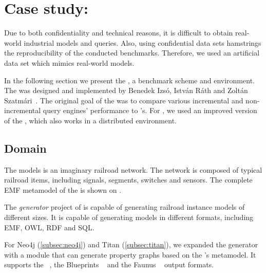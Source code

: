 \section{Case study: \tb{}}
\label{sec:trainbenchmark}

Due to both confidentiality and technical reasons, it is difficult to obtain real-world industrial models and queries. Also, using confidential data sets hamstrings the reproducibility of the conducted benchmarks. Therefore, we used an artificial data set which mimics real-world models.

In the following section we present the \textit{\tb{}}, a benchmark scheme and environment. The \tb{} was designed and implemented by Benedek Izsó, István Ráth and Zoltán Szatmári~\cite{Izso:2012:ODD:2428516.2428523}. The original goal of the \tb{} was to compare various incremental and non-incremental query engines' performance to \eiq{}'s. For \iqd{}, we used an improved version of the \tb{}, which also works in a distributed environment.

\subsection{Domain}


The \tb{} models is an imaginary railroad network. The network is composed of typical railroad items, including signals, segments, switches and sensors. The complete EMF metamodel of the \tb{} is shown on . 

The \textit{generator} project of \tb{} is capable of generating railroad instance models of different sizes. It is capable of generating models in different formats, including EMF, OWL, RDF and SQL. 

For Neo4j (\autoref{subsec:neo4j}) and Titan (\autoref{subsec:titan}), we expanded the generator with a module that can generate property graphs based on the \tb{}'s metamodel. It supports the \graphml{}~\cite{GraphML}, the Blueprints \graphson{}~\cite{BlueprintsGraphSON} and the Faunus \graphson{}~\cite{FaunusGraphSON} output formats.


